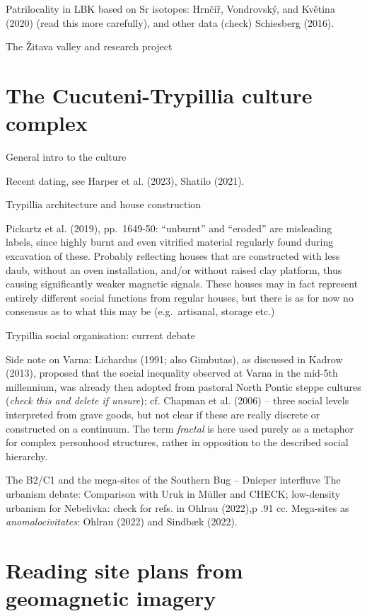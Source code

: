 \documentclass[
  12pt,
]{book}
\begin{document}
Patrilocality in LBK based on Sr isotopes: Hrnčíř, Vondrovský, and Květina (2020) (read this more carefully), and other data (check) Schiesberg (2016).

The Žitava valley and research project

\hypertarget{trypillia}{%
\section{The Cucuteni-Trypillia culture complex}\label{trypillia}}

General intro to the culture

Recent dating, see Harper et al. (2023), Shatilo (2021).

Trypillia architecture and house construction

Pickartz et al. (2019), pp.~1649-50: ``unburnt'' and ``eroded'' are misleading labels, since highly burnt and even vitrified material regularly found during excavation of these. Probably reflecting houses that are constructed with less daub, without an oven installation, and/or without raised clay platform, thus causing significantly weaker magnetic signals. These houses may in fact represent entirely different social functions from regular houses, but there is as for now no consensus as to what this may be (e.g.~artisanal, storage etc.)

Trypillia social organisation: current debate

Side note on Varna: Lichardus (1991; also Gimbutas), as discussed in Kadrow (2013), proposed that the social inequality observed at Varna in the mid-5th millennium, was already then adopted from pastoral North Pontic steppe cultures (\emph{check this and delete if unsure}); cf. Chapman et al. (2006) -- three social levels interpreted from grave goods, but not clear if these are really discrete or constructed on a continuum. The term \emph{fractal} is here used purely as a metaphor for complex personhood structures, rather in opposition to the described social hierarchy.

The B2/C1 and the mega-sites of the Southern Bug -- Dnieper interfluve The urbanism debate: Comparison with Uruk in Müller and CHECK; low-density urbanism for Nebelivka: check for refs. in Ohlrau (2022),p .91 cc. Mega-sites as \emph{anomalocivitates}: Ohlrau (2022) and Sindbæk (2022).

\hypertarget{reading-site-plans-from-geomagnetic-imagery}{%
\section{Reading site plans from geomagnetic imagery}\label{reading-site-plans-from-geomagnetic-imagery}}
\end{document}
